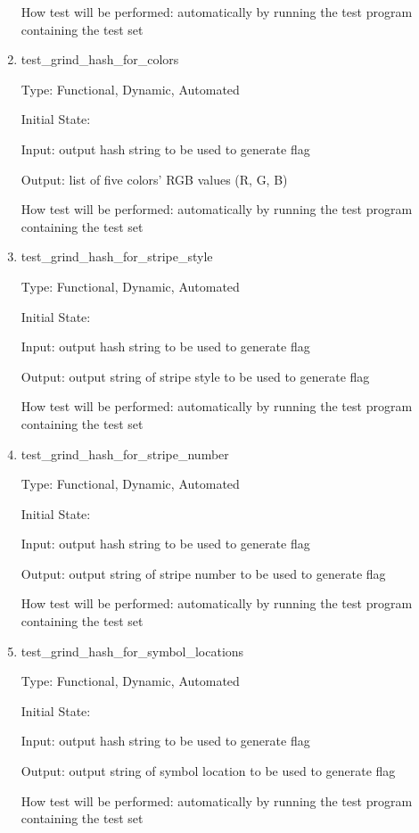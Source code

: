 \documentclass[12pt, titlepage]{article}
\begin{document}
\begin{enumerate}
How test will be performed: automatically by running the test program
containing the test set

\item{test\_grind\_hash\_for\_colors\\}

Type: Functional, Dynamic, Automated

Initial State:

Input: output hash string to be used to generate flag

Output: list of five colors' RGB values (R, G, B)

How test will be performed: automatically by running the test program
containing the test set

\item{test\_grind\_hash\_for\_stripe\_style\\}

Type: Functional, Dynamic, Automated

Initial State:

Input: output hash string to be used to generate flag

Output: output string of stripe style to be used to generate flag

How test will be performed: automatically by running the test program
containing the test set

\item{test\_grind\_hash\_for\_stripe\_number\\}

Type: Functional, Dynamic, Automated

Initial State:

Input: output hash string to be used to generate flag

Output: output string of stripe number to be used to generate flag

How test will be performed: automatically by running the test program
containing the test set

\item{test\_grind\_hash\_for\_symbol\_locations\\}

Type: Functional, Dynamic, Automated

Initial State:

Input: output hash string to be used to generate flag

Output: output string of symbol location to be used to generate flag

How test will be performed: automatically by running the test program
containing the test set


\end{enumerate}
\end{document}
